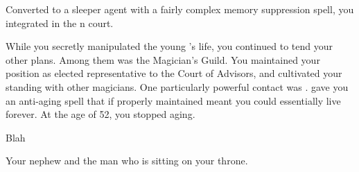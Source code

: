 \documentclass[char]{NeptuneBall}
\begin{document}
Converted to a sleeper agent with a fairly complex memory suppression spell, you integrated \cQueen{\them} in the \pAtlantis{}n court.

While you secretly manipulated the young \cKing{\prince}'s life, you continued to tend your other plans. Among them was the Magician's Guild. You maintained your position as elected representative to the Court of Advisors, and cultivated your standing with other magicians. One particularly powerful contact was \cWitch{}. \cWitch{\They} gave you an anti-aging spell that if properly maintained meant you could essentially live forever. At the age of 52, you stopped aging.



\begin{itemz}[Goals]
  \item Blah
\end{itemz}

\begin{contacts}
  \contact{\cKing{}} Your nephew and the man who is sitting on your throne.
\end{contacts}
\end{document}

